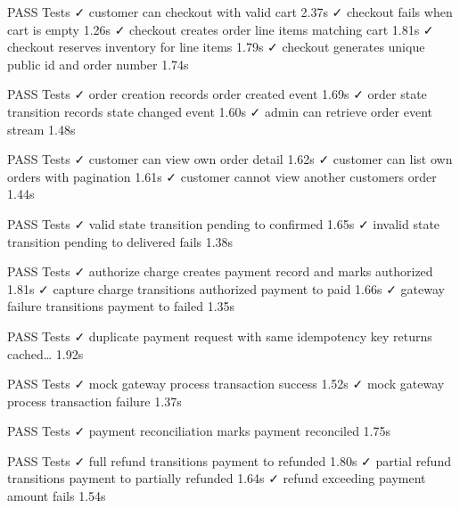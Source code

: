    PASS  Tests\Feature\OrderCheckoutTest
  ✓ customer can checkout with valid cart                                2.37s  
  ✓ checkout fails when cart is empty                                    1.26s  
  ✓ checkout creates order line items matching cart                      1.81s  
  ✓ checkout reserves inventory for line items                           1.79s  
  ✓ checkout generates unique public id and order number                 1.74s  

   PASS  Tests\Feature\OrderEventStreamTest
  ✓ order creation records order created event                           1.69s  
  ✓ order state transition records state changed event                   1.60s  
  ✓ admin can retrieve order event stream                                1.48s  

   PASS  Tests\Feature\OrderRetrievalTest
  ✓ customer can view own order detail                                   1.62s  
  ✓ customer can list own orders with pagination                         1.61s  
  ✓ customer cannot view another customers order                         1.44s  

   PASS  Tests\Feature\OrderStateTransitionTest
  ✓ valid state transition pending to confirmed                          1.65s  
  ✓ invalid state transition pending to delivered fails                   1.38s  

   PASS  Tests\Feature\PaymentChargeTest
  ✓ authorize charge creates payment record and marks authorized         1.81s  
  ✓ capture charge transitions authorized payment to paid                1.66s  
  ✓ gateway failure transitions payment to failed                        1.35s  

   PASS  Tests\Feature\PaymentGatewayIdempotencyTest
  ✓ duplicate payment request with same idempotency key returns cached…  1.92s  

   PASS  Tests\Feature\PaymentGatewayIntegrationTest
  ✓ mock gateway process transaction success                             1.52s  
  ✓ mock gateway process transaction failure                             1.37s  

   PASS  Tests\Feature\PaymentReconciliationTest
  ✓ payment reconciliation marks payment reconciled                      1.75s  

   PASS  Tests\Feature\PaymentRefundTest
  ✓ full refund transitions payment to refunded                          1.80s  
  ✓ partial refund transitions payment to partially refunded             1.64s  
  ✓ refund exceeding payment amount fails                                1.54s  

